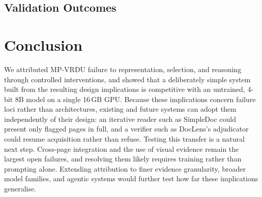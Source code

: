 \documentclass[11pt]{article}
\begin{document}
\subsection{Validation Outcomes}
\label{sec:simple_method_results}





\section{Conclusion}
\label{sec:conclusion}

We attributed MP-VRDU failure to representation, selection, and reasoning through controlled interventions, and showed that a deliberately simple system built from the resulting design implications is competitive with an untrained, 4-bit 8B model on a single 16\,GB GPU. Because these implications concern failure loci rather than architectures, existing and future systems can adopt them independently of their design: an iterative reader such as SimpleDoc could present only flagged pages in full, and a verifier such as DocLens's adjudicator could resume acquisition rather than refuse. Testing this transfer is a natural next step. Cross-page integration and the use of visual evidence remain the largest open failures, and resolving them likely requires training rather than prompting alone. Extending attribution to finer evidence granularity, broader model families, and agentic systems would further test how far these implications generalise.
\end{document}
